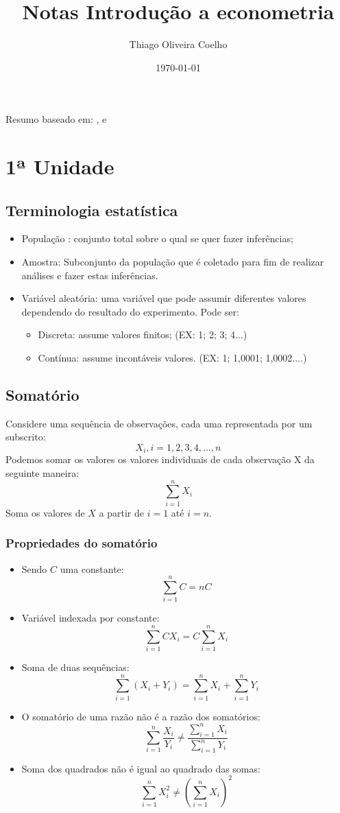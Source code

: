 \documentclass[12pt,a4paper,oneside,brazil]{abntex2}
\title{Notas Introdução a econometria}
\author{Thiago Oliveira Coelho}
\date{\today}
\begin{document}
\pagestyle{plain}

\maketitle
\begin{center}
Resumo baseado em: \cite{gujarati}, \cite{wooldridge} e \cite{magalhaes}
\end{center}
\tableofcontents

\chapter{1ª Unidade}
\section{Terminologia estatística}
\begin{itemize}
\item População : conjunto total sobre o qual se quer fazer inferências;
\item Amostra: Subconjunto da população que é coletado para fim de realizar análises e fazer estas inferências.
\item Variável aleatória: uma variável que pode assumir diferentes valores dependendo do resultado do experimento. Pode ser:
\begin{itemize}
\item Discreta: assume valores finitos; (EX: 1; 2; 3; 4...)
\item Contínua: assume incontáveis valores. (EX: 1; 1,0001; 1,0002....)
\end{itemize}
\end{itemize}

\section{Somatório}
Considere uma sequência de observações, cada uma representada por um subscrito:
\[ X_i, i = 1,2,3,4,...,n\]
Podemos somar os valores os valores individuais de cada observação X da seguinte maneira:
\[ \sum_{i=1}^{n} X_i\]
Soma os valores de $X$ a partir de $i =1$ até $i =n$.

\subsection{Propriedades do somatório}

\begin{itemize}
\item Sendo $C$ uma constante:
\[\sum_{i=1}^{n} C = n C \]
\item Variável indexada por constante:
\[ \sum_{i=1}^{n} C X_i = C \sum_{i=1}^{n} X_i \]
\item Soma de duas sequências:
\[ \sum_{i=1}^{n} (X_i + Y_i) = \sum_{i=1}^{n} X_i + \sum_{i=1}^{n} Y_i \]
\item O somatório de uma razão não é a razão dos somatórios:
\[ \sum_{i=1}^{n} \frac{X_i}{Y_i} \neq \frac{\sum_{i=1}^{n} X_i}{\sum_{i=1}^{n} Y_i} \]
\item Soma dos quadrados não é igual ao quadrado das somas:
\[ \sum_{i=1}^{n} X_i^2 \neq (\sum_{i=1}^{n} X_i)^2 \]
 \end{itemize}
 
\end{document}
